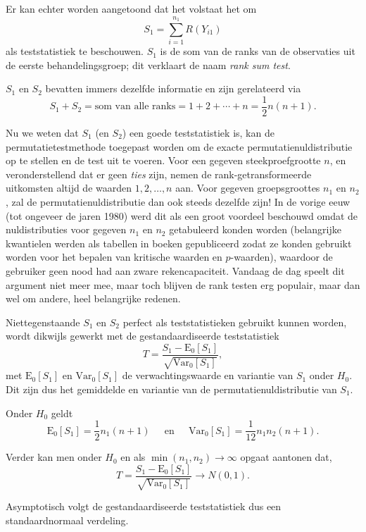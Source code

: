 \documentclass[12pt,dutch,coursenotes]{book}
\theoremstyle{definition}
\theoremstyle{definition}
\theoremstyle{definition}
\theoremstyle{remark}
\begin{document}
Er kan echter worden aangetoond dat het volstaat het om
\[S_1=\sum_{i=1}^{n_1} R(Y_{i1})\] als teststatistiek te beschouwen.
\(S_1\) is de som van de ranks van de observaties uit de eerste
behandelingsgroep; dit verklaart de naam \emph{rank sum test}.

\(S_1\) en \(S_2\) bevatten immers dezelfde informatie en zijn
gerelateerd via \[
  S_1+S_2 = \text{som van alle ranks} = 1+2+\cdots + n=\frac{1}{2}n(n+1).
\]

Nu we weten dat \(S_1\) (en \(S_2\)) een goede teststatistiek is, kan de
permutatietestmethode toegepast worden om de exacte
permutatienuldistributie op te stellen en de test uit te voeren. Voor
een gegeven steekproefgrootte \(n\), en veronderstellend dat er geen
\emph{ties} zijn, nemen de rank-getransformeerde uitkomsten altijd de
waarden \(1, 2, \ldots, n\) aan. Voor gegeven groepsgroottes \(n_1\) en
\(n_2\), zal de permutatienuldistributie dan ook steeds dezelfde zijn!
In de vorige eeuw (tot ongeveer de jaren 1980) werd dit als een groot
voordeel beschouwd omdat de nuldistributies voor gegeven \(n_1\) en
\(n_2\) getabuleerd konden worden (belangrijke kwantielen werden als
tabellen in boeken gepubliceerd zodat ze konden gebruikt worden voor het
bepalen van kritische waarden en \(p\)-waarden), waardoor de gebruiker
geen nood had aan zware rekencapaciteit. Vandaag de dag speelt dit
argument niet meer mee, maar toch blijven de rank testen erg populair,
maar dan wel om andere, heel belangrijke redenen.

Niettegenstaande \(S_1\) en \(S_2\) perfect als teststatistieken
gebruikt kunnen worden, wordt dikwijls gewerkt met de gestandaardiseerde
teststatistiek \[
  T = \frac{S_1-\text{E}_{0}\left[S_1\right]}{\sqrt{\text{Var}_{0}\left[S_1\right]}},
\] met \(\text{E}_{0}\left[S_1\right]\) en
\(\text{Var}_{0}\left[S_1\right]\) de verwachtingswaarde en variantie
van \(S_1\) onder \(H_0\). Dit zijn dus het gemiddelde en variantie van
de permutatienuldistributie van \(S_1\).

Onder \(H_0\) geldt \[
   \text{E}_{0}\left[S_1\right]= \frac{1}{2}n_1(n+1) \;\;\;\;\text{ en }\;\;\;\; \text{Var}_{0}\left[S_1\right]=\frac{1}{12}n_1n_2(n+1).
 \]

Verder kan men onder \(H_0\) en als \(\min(n_1,n_2)\rightarrow \infty\)
opgaat aantonen dat, \[
    T = \frac{S_1-\text{E}_{0}\left[S_1\right]}{\sqrt{\text{Var}_{0}\left[S_1\right]}} \rightarrow N(0,1).  
 \]

Asymptotisch volgt de gestandaardiseerde teststatistiek dus een
standaardnormaal verdeling.
\end{document}
